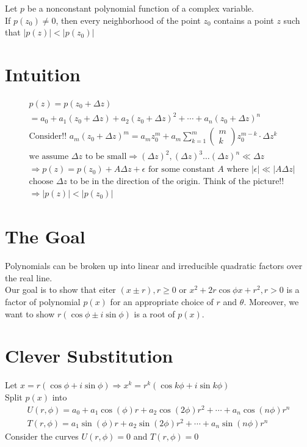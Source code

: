 \documentclass[10pt]{article}
\begin{document}
Let $p$ be a nonconstant polynomial function of a complex variable.\\
If $p(z_0)\neq 0$, then every neighborhood of the point $z_0$ contains a point $z$ such that $\lvert p(z)\rvert<\lvert p(z_0)\rvert$
\section*{Intuition}
\begin{align*}
    &p(z)=p(z_0+\Delta z)\\
    &=a_0+a_1(z_0+\Delta z)+a_2{(z_0+\Delta z)}^2+\cdots+a_n{(z_0+\Delta z)}^n\\
    &\text{Consider!! }a_m{(z_0+\Delta z)}^m=a_m z_0^m+a_m\sum_{k=1}^{m}\begin{pmatrix}
        m\\
        k
    \end{pmatrix}z_0^{m-k}\cdot \Delta z^k\\
    &\text{we assume }\Delta z\text{ to be small}\Rightarrow {(\Delta z)}^2,{(\Delta z)}^3\ldots {(\Delta z)}^n\ll \Delta z\\
    &\Rightarrow p(z)=p(z_0)+A\Delta z+\epsilon \text{ for some constant }A\text{ where }\lvert \epsilon\rvert \ll \lvert A\Delta z\rvert\\
    &\text{choose }\Delta z\text{ to be in the direction of the origin. Think of the picture!!}\\
    &\Rightarrow \lvert p(z)\rvert<\lvert p(z_0)\rvert
\end{align*}
\section*{The Goal}
Polynomials can be broken up into linear and irreducible quadratic factors over the real line.\\
Our goal is to show that eiter $(x\pm r),r\ge 0$ or $x^2+2r\cos\phi x+r^2,r>0$ is a factor of polynomial $p(x)$ for an appropriate choice of $r$ and $\theta$.
Moreover, we want to show $r(\cos\phi\pm i\sin\phi)$ is a root of $p(x)$.
\section*{Clever Substitution}
Let $x=r(\cos\phi+ i\sin\phi)\Rightarrow x^k=r^k(\cos k\phi+ i\sin k\phi)$\\
Split $p(x)$ into\begin{align*}
    U(r,\phi)=a_0+a_1\cos(\phi) r+a_2\cos(2\phi) r^2+\cdots+a_n\cos (n\phi) r^n\\
    T(r,\phi)=a_1\sin(\phi) r+a_2\sin(2\phi) r^2+\cdots+a_n\sin (n\phi) r^n
\end{align*}
Consider the curves $U(r,\phi)=0$ and $T(r,\phi)=0$
\end{document}
